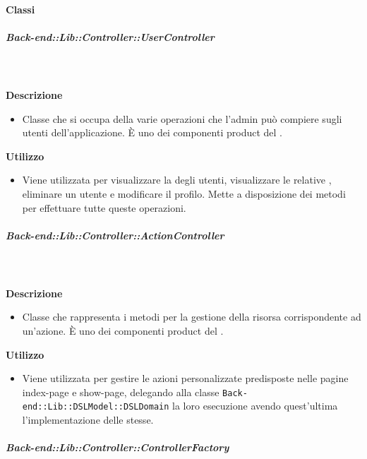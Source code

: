     \paragraph{Classi}
      \subparagraph{Back-end::Lib::Controller::UserController}
        
        \textbf{\\ \\ Descrizione} 
          \begin{itemize}
            \item[] Classe che si occupa della varie operazioni che l'admin può compiere sugli utenti dell'applicazione. È uno dei componenti product del  .
          \end{itemize}      
        \textbf{Utilizzo}  
          \begin{itemize}
            \item[] Viene utilizzata per visualizzare la  degli utenti, visualizzare le relative , eliminare un utente e modificare il profilo. Mette a disposizione dei metodi per effettuare tutte queste operazioni.
          \end{itemize}
      \subparagraph{Back-end::Lib::Controller::ActionController}
        
        \textbf{\\ \\ Descrizione} 
          \begin{itemize}
            \item[] Classe che rappresenta i metodi per la gestione della risorsa corrispondente ad un'azione. 
È uno dei componenti product del  .
          \end{itemize}      
        \textbf{Utilizzo}  
          \begin{itemize}
            \item[] Viene utilizzata per gestire le azioni personalizzate predisposte nelle pagine index-page e show-page, delegando alla classe \texttt{Back-end::Lib::DSLModel::DSLDomain} la loro esecuzione avendo quest'ultima l'implementazione delle stesse. 
          \end{itemize}
      \subparagraph{Back-end::Lib::Controller::ControllerFactory}
        
